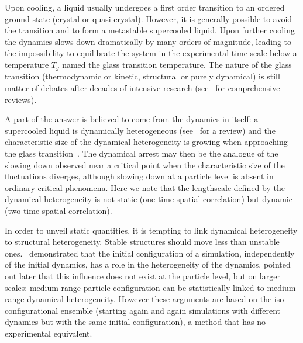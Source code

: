 
Upon cooling, a liquid usually undergoes a first order transition to an ordered ground state (crystal or quasi-crystal). However, it is generally possible to avoid the transition and to form a metastable supercooled liquid. Upon further cooling the dynamics slows down dramatically by many orders of magnitude, leading to the impossibility to equilibrate the system in the experimental time scale below a temperature $T_g$ named the glass transition temperature. The nature of the glass transition (thermodynamic or kinetic, structural or purely dynamical) is still matter of debates after decades of intensive research (see~\citep{cavagna2009supercooled,BerthierR} for comprehensive reviews).

A part of the answer is believed to come from the dynamics in itself: a supercooled liquid is dynamically heterogeneous (see~\citep{BerthierR} for a review) and the characteristic size of the dynamical heterogeneity is growing when approaching the glass transition~\citep{yamamoto1998, Donati1999a}. The dynamical arrest may then be the analogue of the slowing down observed near a critical point when the characteristic size of the fluctuations diverges, although slowing down at a particle level is absent in ordinary critical phenomena. Here we note that the lengthscale defined by the dynamical heterogeneity is not static (one-time spatial correlation) but dynamic (two-time spatial correlation). 

In order to unveil static quantities, it is tempting to link dynamical heterogeneity to structural heterogeneity. Stable structures should move less than unstable ones.~\citet{Widmer-Cooper2005} demonstrated that the initial configuration of a simulation, independently of the initial dynamics, has a role in the heterogeneity of the dynamics. \citet{Berthier2007} pointed out later that this influence does not exist at the particle level, but on larger scales: medium-range particle configuration can be statistically linked to medium-range dynamical heterogeneity. However these arguments are based on the iso-configurational ensemble (starting again and again simulations with different dynamics but with the same initial configuration), a method that has no experimental equivalent.

